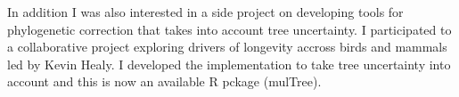 In addition I was also interested in a side project on developing tools for phylogenetic correction that takes into account tree uncertainty.
I participated to a collaborative project exploring drivers of longevity accross birds and mammals led by Kevin Healy.
I developed the implementation to take tree uncertainty into account and this is now an available R pckage (mulTree).
